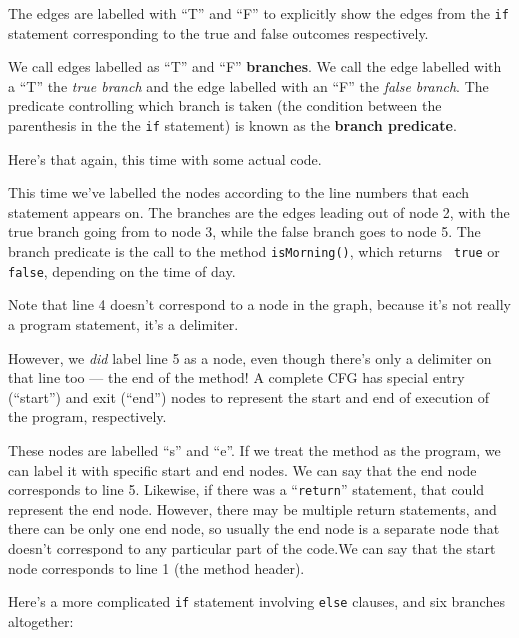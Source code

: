 The edges are labelled with ``T'' and ``F'' to explicitly show the edges from
the {\tt if} statement corresponding to the true and false outcomes
respectively.

We call edges labelled as ``T'' and ``F'' {\bf branches}. We call the edge
labelled with a ``T'' the {\it true branch} and the edge labelled with an ``F''
the {\it false branch}. The predicate controlling which branch is taken (the
condition between the parenthesis in the the {\tt if} statement) is known as the
{\bf branch predicate}.


Here's that again, this time with some actual code. 


This time we've labelled the nodes according to the line numbers that each
statement appears on. The branches are the edges leading out of node 2, with the
true branch going from to node 3, while the false branch goes to node 5. The
branch predicate is the call to the method {\tt isMorning()}, which returns {\tt
true} or {\tt false}, depending on the time of day.

Note that line 4 doesn't correspond to a node in the graph, because it's not
really a program statement, it's a delimiter.

However, we {\it did} label line 5 as a node, even though there's only a
delimiter on that line too --- the end of the method! A complete CFG has special
entry (``start'') and exit (``end'') nodes to represent the start and end of
execution of the program, respectively. 


These nodes are labelled ``s'' and ``e''. If we treat the method as the program,
we can label it with specific start and end nodes. We can say that the end node
corresponds to line 5. Likewise, if there was a ``{\tt return}'' statement, that
could represent the end node. However, there may be multiple return statements,
and there can be only one end node, so usually the end node is a separate node
that doesn't correspond to any particular part of the code.We can say that the
start node corresponds to line 1 (the method header). 


Here's a more complicated {\tt if} statement involving {\tt else} clauses, and
six branches altogether:


